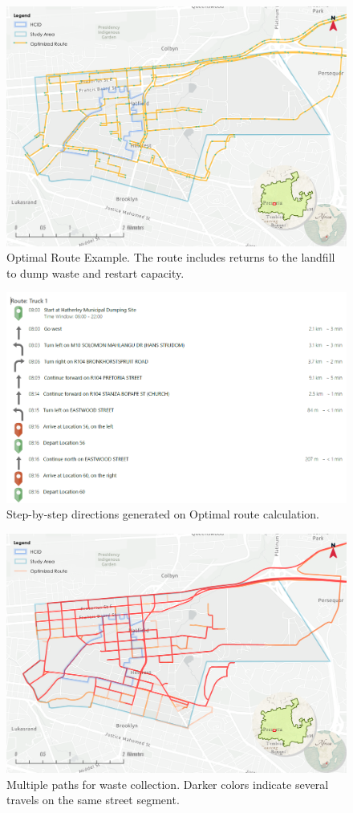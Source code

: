 \documentclass[authoryear,preprint,review,doubleblind, 12pt]{elsarticle}
\begin{document}
    \begin{figure}[h!]
    \centering
    \includegraphics[width=0.8\linewidth]{Figures/Optimal route.png}
        \caption{Optimal Route Example. The route includes returns to the landfill to dump waste and restart capacity.}
        \label{fig:road3}
    \end{figure}

    \begin{figure}[h!]
    \centering
        \includegraphics[width=0.9\linewidth]{Figures/road4.png}
        \caption{Step-by-step directions generated on Optimal route calculation.}
        \label{fig:road4}
    \end{figure}

    \begin{figure}[h!]
    \centering
        \includegraphics[width=0.8\linewidth]{Figures/Optimal Several runs.png}
        \caption{Multiple paths for waste collection. Darker colors indicate several travels on the same street segment.}
        \label{fig:road5}
    \end{figure}
\end{document}

